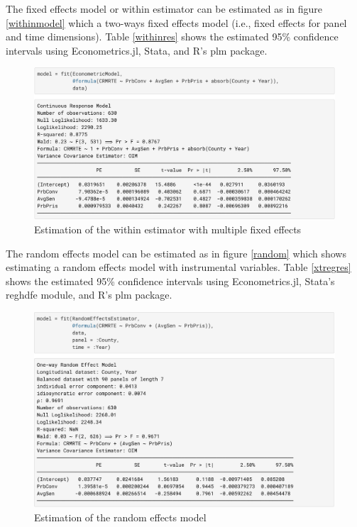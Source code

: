 \documentclass{juliacon}
\begin{document}
The fixed effects model or within estimator can be estimated as in figure \vref{withinmodel} which a two-ways fixed effects model (i.e., fixed effects for panel and time dimensions). Table \vref{withinres} shows the estimated 95\% confidence intervals using Econometrics.jl, Stata, and R's plm package.

\begin{figure}[hbpt]
	\includegraphics[max width=\linewidth,center]{estimator_fe}
	\caption{Estimation of the within estimator with multiple fixed effects}
	\label{withinmodel}
\end{figure}

\newpage

The random effects model can be estimated as in figure \vref{random} which shows estimating a random effects model with instrumental variables. Table \vref{xtregres} shows the estimated 95\% confidence intervals using Econometrics.jl, Stata's reghdfe module, and R's plm package.

\begin{figure}[hbpt]
	\includegraphics[max width=\linewidth,center]{estimator_ivre}
	\caption{Estimation of the random effects model}
	\label{random}
\end{figure}
\end{document}
